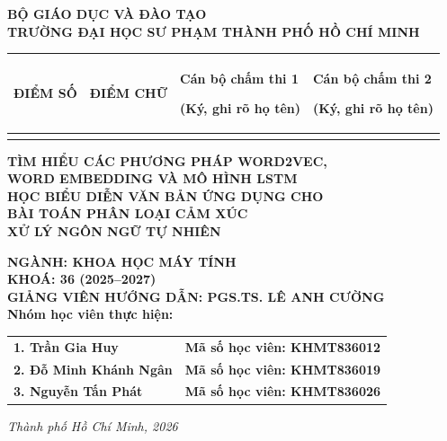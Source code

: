 \documentclass[12pt,a4paper]{article}
\begin{document}
\newpage
\thispagestyle{empty}
\begin{center}
    {\large\bfseries BỘ GIÁO DỤC VÀ ĐÀO TẠO}\\[0.2cm]
    {\large\bfseries TRƯỜNG ĐẠI HỌC SƯ PHẠM THÀNH PHỐ HỒ CHÍ MINH}\\[1.0cm]

    \renewcommand{\arraystretch}{1.3}
    \begin{tabular}{|m{2.1cm}|m{2.3cm}|m{4.8cm}|m{4.8cm}|}
        \hline
        \centering\bfseries ĐIỂM SỐ & \centering\bfseries ĐIỂM CHỮ & \centering\bfseries Cán bộ chấm thi 1\par\small (Ký, ghi rõ họ tên) & \centering\arraybackslash\bfseries Cán bộ chấm thi 2\par\small (Ký, ghi rõ họ tên) \\
        \hline
        \rule{0pt}{1.8cm} & & & \\[1.8cm]
        \hline
    \end{tabular}

    \vspace{1.3cm}

    {\Large\bfseries TÌM HIỂU CÁC PHƯƠNG PHÁP WORD2VEC,}\\[0.25cm]
    {\Large\bfseries WORD EMBEDDING VÀ MÔ HÌNH LSTM}\\[0.25cm]
    {\Large\bfseries HỌC BIỂU DIỄN VĂN BẢN ỨNG DỤNG CHO}\\[0.25cm]
    {\Large\bfseries BÀI TOÁN PHÂN LOẠI CẢM XÚC}\\[1.2cm]

    {\large\bfseries XỬ LÝ NGÔN NGỮ TỰ NHIÊN}\\[1.4cm]

    \begin{singlespace}
        {\normalsize\bfseries NGÀNH: KHOA HỌC MÁY TÍNH}\\[0.25cm]
        {\normalsize\bfseries KHOÁ: 36 (2025--2027)}\\[0.25cm]
        {\normalsize\bfseries GIẢNG VIÊN HƯỚNG DẪN: PGS.TS. LÊ ANH CƯỜNG}\\[0.8cm]
        
        \textbf{Nhóm học viên thực hiện:}\\[0.35cm]
        \begin{tabular}{ll}
            \textbf{1. Trần Gia Huy} & \textbf{Mã số học viên: KHMT836012} \\
            \textbf{2. Đỗ Minh Khánh Ngân} & \textbf{Mã số học viên: KHMT836019} \\
            \textbf{3. Nguyễn Tấn Phát} & \textbf{Mã số học viên: KHMT836026} \\
        \end{tabular}
    \end{singlespace}

    \vfill
    {\large\itshape Thành phố Hồ Chí Minh, 2026}
\end{center}
\end{document}
